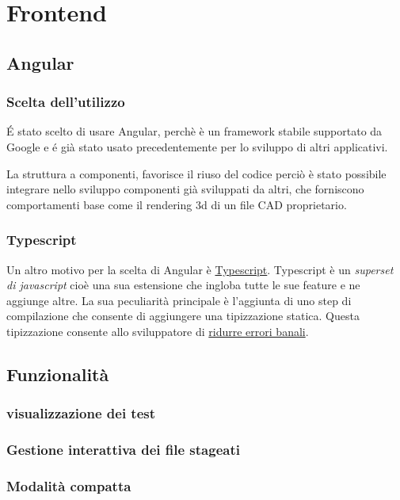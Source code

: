 \chapter{Frontend}
    \section{Angular}
        \subsection{Scelta dell'utilizzo}
            \'E stato scelto di usare Angular, perchè è un framework stabile supportato da Google
            e \'e già stato usato precedentemente per lo sviluppo di altri applicativi.
            
            La struttura a componenti, favorisce il riuso del codice perciò è stato possibile integrare
            nello sviluppo componenti già sviluppati da altri, che forniscono comportamenti base
            come il rendering 3d di un file CAD proprietario.
        
        \subsection{Typescript}
            Un altro motivo per la scelta di Angular è \href{https://www.typescriptlang.org}{Typescript}.
            Typescript è un \textit{superset di javascript} cioè una sua estensione che ingloba tutte le sue feature e ne aggiunge altre.
            La sua peculiarità principale è l'aggiunta di uno step di compilazione che consente di aggiungere una tipizzazione statica.
            Questa tipizzazione consente allo sviluppatore di
            \href{https://www.quora.com/Why-is-type-checking-important-in-programming-languages-and-how-should-one-choose-between-dynamically-and-statically-typed-languages}{ridurre errori banali}.
    \section{Funzionalità}
        \subsection{visualizzazione dei test}         
        \subsection{Gestione interattiva dei file stageati}         
        \subsection{Modalità compatta}
